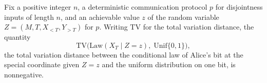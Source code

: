 \begin{theorem}
\label{CommunicationComplexity.Functions.Disjointness.RandomizedLowerBound.xDistance_nonneg}
\leanok
{}
Fix a positive integer $n$, a deterministic communication protocol $p$ for disjointness
inputs of length $n$, and an achievable value $z$ of the random variable $Z = (M, T,
X_{<T}, Y_{>T})$ for $p$. Writing $\mathrm{TV}$ for the total variation distance, the
quantity
\[
\mathrm{TV}\bigl(\mathrm{Law}(X_T \mid Z = z),\; \mathrm{Unif}\{0,1\}\bigr),
\]
the total variation distance between the conditional law of Alice's bit at the special
coordinate given $Z = z$ and the uniform distribution on one bit, is nonnegative.
\end{theorem}

